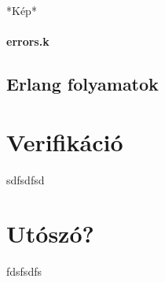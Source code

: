 \documentclass[twoside, a4paper, 12pt]{article}
\begin{document}
*Kép*

\paragraph{errors.k}

\subsection{Erlang folyamatok}


\section{Verifikáció}
sdfsdfsd

\section{Utószó?}
fdsfsdfs


\newpage

\printbibliography[title = {Referencia}]
\end{document}
